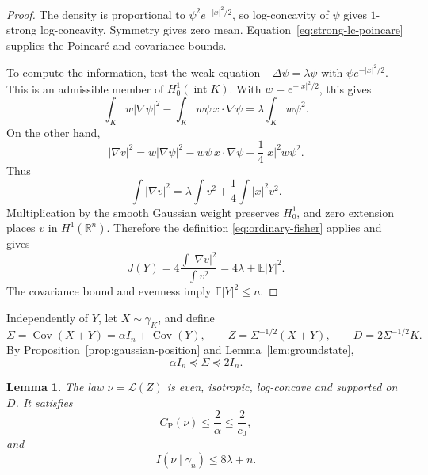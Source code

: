 \documentclass[11pt]{amsart}
\numberwithin{equation}{section}
\newtheorem{lemma}[theorem]{Lemma}
\theoremstyle{definition}
\theoremstyle{remark}
\newcommand{\R}{\mathbb R}
\newcommand{\E}{\mathbb E}
\newcommand{\Id}{I_n}
\newcommand{\gam}{\gamma_n}
\newcommand{\CP}{C_{\mathrm P}}
\DeclareMathOperator{\Cov}{Cov}
\DeclareMathOperator{\Int}{int}
\begin{document}
\begin{proof}
The density is proportional to
\(\psi^2e^{-|x|^2/2}\), so log-concavity of \(\psi\) gives
\(1\)-strong log-concavity. Symmetry gives zero mean.
Equation~\eqref{eq:strong-lc-poincare} supplies the Poincar\'e and
covariance bounds.

To compute the information, test the weak equation
\(-\Delta\psi=\lambda\psi\) with
\(\psi e^{-|x|^2/2}\). This is an admissible member of
\(H_0^1(\Int K)\). With \(w=e^{-|x|^2/2}\), this gives
\[
\int_K w|\nabla\psi|^2
-\int_K w\psi\,x\cdot\nabla\psi
=\lambda\int_K w\psi^2.
\]
On the other hand,
\[
|\nabla v|^2
=w|\nabla\psi|^2-w\psi\,x\cdot\nabla\psi
+\frac14|x|^2w\psi^2.
\]
Thus
\begin{equation}\label{eq:groundstate-energy}
\int|\nabla v|^2
=\lambda\int v^2+\frac14\int|x|^2v^2.
\end{equation}
Multiplication by the smooth Gaussian weight preserves \(H_0^1\), and
zero extension places \(v\) in \(H^1(\R^n)\). Therefore the definition
\eqref{eq:ordinary-fisher} applies and gives
\[
J(Y)=4\frac{\int|\nabla v|^2}{\int v^2}
=4\lambda+\E|Y|^2.
\]
The covariance bound and evenness imply \(\E|Y|^2\le n\).
\end{proof}

Independently of \(Y\), let \(X\sim\gamma_K\), and define
\begin{equation}\label{eq:constructed-measure}
\Sigma=\Cov(X+Y)=\alpha\Id+\Cov(Y),\qquad
Z=\Sigma^{-1/2}(X+Y),\qquad
D=2\Sigma^{-1/2}K.
\end{equation}
By Proposition~\ref{prop:gaussian-position} and
Lemma~\ref{lem:groundstate},
\begin{equation}\label{eq:sigma-bounds}
\alpha\Id\preceq\Sigma\preceq2\Id.
\end{equation}

\begin{lemma}\label{lem:constructed-bounds}
The law \(\nu=\mathcal L(Z)\) is even, isotropic, log-concave and
supported on \(D\). It satisfies
\begin{equation}\label{eq:constructed-poincare}
\CP(\nu)\le\frac2\alpha\le\frac2{c_0},
\end{equation}
and
\begin{equation}\label{eq:constructed-fisher}
I(\nu\mid\gam)\le8\lambda+n.
\end{equation}
\end{lemma}
\end{document}

